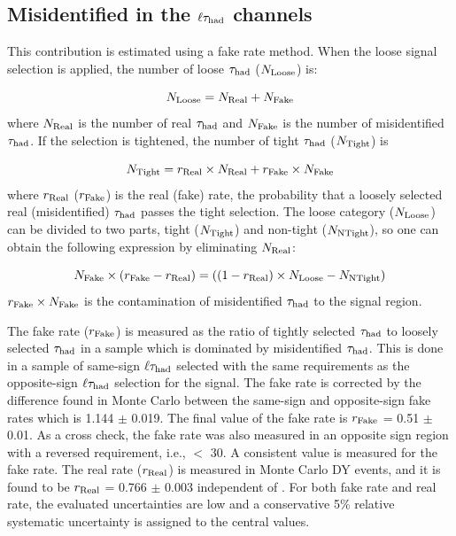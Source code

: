 \subsection{\texorpdfstring{Misidentified \Tau in the $\ell\tau_{\rm had}$ channels}{Misidentified tau in the lepton-tau channels}}
\label{sect:bkgFake}
This contribution is estimated using a fake rate method.
When the loose signal selection is applied, the number of loose $\tau_{\rm had}$ ($N_{\rm Loose}$) is:

\begin{equation}
N_{\rm Loose} = N_{\rm Real} + N_{\rm Fake}
\end{equation}
where $N_{\rm Real}$ is the number of real $\tau_{\rm had}$ and $N_{\rm Fake}$ is the number of misidentified 
$\tau_{\rm had}$. If the selection is tightened, the number of tight $\tau_{\rm had}$ ($N_{\rm Tight}$) is

\begin{equation}
 N_{\rm Tight} = r_{\rm Real}\times N_{\rm Real} + r_{\rm Fake}\times N_{\rm Fake}
\end{equation} 
where $r_{\rm Real}$ ($r_{\rm Fake}$) is the real (fake) rate, the probability that a loosely selected real (misidentified) $\tau_{\rm had}$ passes the  tight  selection. 
The loose category ($N_{\rm Loose}$) can be divided to two parts, 
tight ($N_{\rm Tight}$) and non-tight ($N_{\rm NTight}$), so one can obtain the following expression by eliminating $N_{\rm Real}$:

\begin{equation}
   N_{\rm Fake}\times (r_{\rm Fake}-r_{\rm Real}) = ((1 - r_{\rm Real})\times N_{\rm Loose}  - N_{\rm NTight})
\end{equation}
$r_{\rm Fake}\times N_{\rm Fake}$ is the contamination of misidentified $\tau_{\rm had}$ to the signal region. 

The fake rate ($r_{\rm Fake}$) is measured as the ratio of tightly selected $\tau_{\rm had}$ to loosely 
selected $\tau_{\rm had}$ in a sample which is dominated by misidentified $\tau_{\rm had}$. This is done in a sample of same-sign $\ell\tau_{\rm had}$ selected 
with the same requirements as the opposite-sign $\ell\tau_{\rm had}$
selection for the signal.
The fake rate is corrected by the difference found in Monte Carlo between the 
same-sign and opposite-sign fake rates which is 1.144 $\pm$ 0.019.
The final value of the fake rate is $r_{\rm Fake}$ = 0.51 $\pm$ 0.01. 
As a cross check, the fake rate was also measured in an opposite sign region with a reversed
\MPT requirement, i.e., \MPT $<$ 30\GeV.
A consistent value is measured for the fake rate.  
The real rate ($r_{\rm Real}$) is measured in Monte Carlo DY events, and it is found to 
be $r_{\rm Real}$ = 0.766 $\pm$ 0.003 independent of \mttwo. 
For both fake rate and real rate, the evaluated uncertainties are low and a conservative 
5\% relative systematic uncertainty is assigned to the central values.

